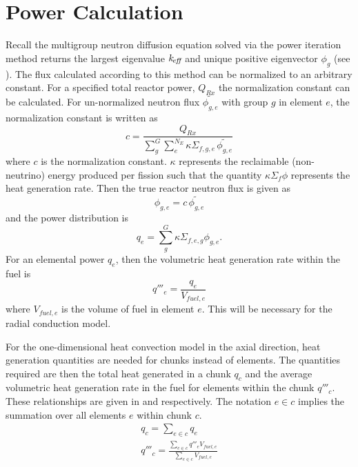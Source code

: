 \section{Power Calculation}
  Recall the multigroup neutron diffusion equation solved via the power
  iteration method returns the largest eigenvalue $k_{\!\mbox{\scriptsize \em eff}}$ and unique positive
  eigenvector $\phi_g$ (see ). The flux calculated
  according to this method can be normalized to an arbitrary constant. For a
  specified total reactor power, $Q_{Rx}$ the normalization constant can be 
  calculated. For un-normalized neutron flux $\widetilde{\phi_{g,e}}$ with group
  $g$ in element $e$, the normalization constant is written as
  \begin{equation}
    \label{eq:normalization_c}
    c = \frac{Q_{Rx}}{\sum_{g}^{G} \sum_{e}^{N_E} \kappa \Sigma_{f,g,e} \,
      \widetilde{\phi_{g,e}}}
  \end{equation}
  where $c$ is the normalization constant. $\kappa$ represents the reclaimable
  (non-neutrino) energy produced per fission such that the quantity $\kappa
  \Sigma_f \phi$ represents the heat generation rate. Then the true reactor
  neutron flux is given as
  \begin{equation}
    \label{eq:normalization_phi}
    \phi_{g,e} = c \, \widetilde{\phi_{g,e}}
  \end{equation}
  and the power distribution is 
  \begin{equation}
    \label{eq:elementpwr}
    q_{e} = \sum_g^G \kappa \Sigma_{f,e,g} \phi_{g,e}.
  \end{equation}
  For an elemental power $q_e$, then the volumetric heat generation rate within
  the fuel is 
  \begin{equation}
    \label{eq:elementqppp_fuel}
    q'''_{e} = \frac{q_e}{V_{fuel,e}}
  \end{equation}
  where $V_{fuel,e}$ is the volume of fuel in element $e$. This will be
  necessary for the radial conduction model.

  For the one-dimensional heat convection model in the axial direction,
  heat generation quantities are needed for chunks instead of elements.
  The quantities required are then the total heat generated in a chunk $q_c$ and
  the average volumetric heat generation rate in the fuel for elements within
  the chunk $q'''_c$. These relationships are given in  and
   respectively. The notation $e \in c$ implies the
  summation over all elements $e$ within chunk $c$.
  \begin{align}
    \label{eq:chunkpwr}
    q_c = \sum_{e \in c} q_e \\
    \label{eq:chunkqppp_fuel}
    q'''_c = \frac{\sum_{e \in c} q'''_e V_{fuel,e}}{\sum_{e \in c} V_{fuel,e}}
  \end{align}

